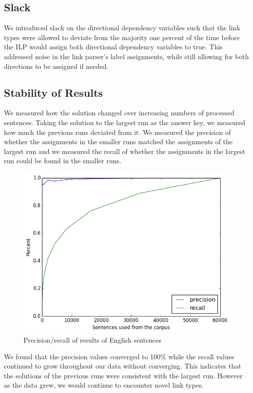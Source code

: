 \documentclass[11pt]{article}
\begin{document}
\subsection{Slack}
We introduced slack on the directional dependency variables such that the link types were allowed to deviate from the majority one percent of the time before the ILP would assign both directional dependency variables to true. This addressed noise in the link parser's label assignments, while still allowing for both directions to be assigned if needed.


\subsection{Stability of Results}
We measured how the solution changed over increasing numbers of processed sentences. 
Taking the solution to the largest run as the answer key, we measured how much the previous runs deviated from it. We measured the precision of whether the assignments in the smaller runs matched the assignments of the largest run and we measured the recall of whether the assignments in the largest run could be found in the smaller runs. 
\begin{figure}[ht!]
  \small
  \includegraphics[width=\linewidth, keepaspectratio=true]{figure/precision_recall.png}
  \caption{\small Precision/recall of results of English sentences}
\end{figure}
We found that the precision values converged to 100\% while the recall values continued to grow throughout our data without converging. This indicates that the solutions of the previous runs were consistent with the largest run. However as the data grew, we would continue to encounter novel link types.
\end{document}

